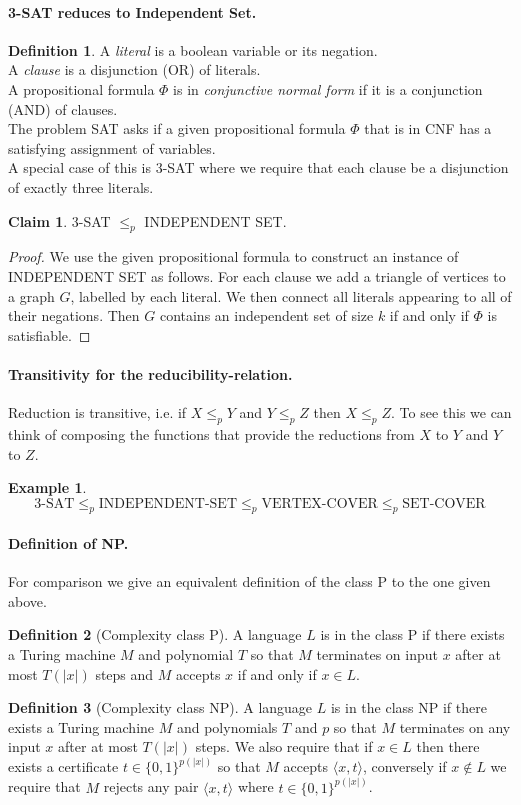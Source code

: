 \documentclass[11pt,a4paper]{article}
\theoremstyle{definition}
\newtheorem{claim}{Claim}
\newtheorem{defn}{Definition}
\newtheorem*{ex}{Example}
\begin{document}
\paragraph{3-SAT reduces to Independent Set.}
\begin{defn}
A \emph{literal} is a boolean variable or its negation.\\
A \emph{clause} is a disjunction (OR) of literals.\\
A propositional formula $\Phi$ is in \emph{conjunctive normal form} if it is a conjunction (AND) of clauses.\\
The problem SAT asks if a given propositional formula $\Phi$ that is in CNF has a satisfying assignment of variables.\\
A special case of this is 3-SAT where we require that each clause be a disjunction of exactly three literals.
\end{defn}
\begin{claim}
3-SAT $\le_p$ INDEPENDENT SET.
\end{claim}
\begin{proof}
We use the given propositional formula to construct an instance of INDEPENDENT SET as follows.
For each clause we add a triangle of vertices to a graph $G$, labelled by each literal.
We then connect all literals appearing to all of their negations.
Then $G$ contains an independent set of size $k$ if and only if $\Phi$ is satisfiable.
\end{proof}

\paragraph{Transitivity for the reducibility-relation.}
Reduction is transitive, i.e. if $X \le_p Y$ and $Y \le_p Z$ then $X\le_p Z$.
To see this we can think of composing the functions that provide the reductions from $X$ to $Y$ and $Y$ to $Z$.
\begin{ex}
\[
3\text{-SAT}\le_p \text{INDEPENDENT-SET} \le_p \text{VERTEX-COVER} \le_p \text{SET-COVER}
\]
\end{ex}

\paragraph{Definition of NP.}
For comparison we give an equivalent definition of the class P to the one given above.
\begin{defn}[Complexity class P]
A language $L$ is in the class P if there exists a Turing machine $M$ and polynomial $T$ so that $M$ terminates on input $x$ after at most $T(|x|)$ steps and $M$ accepts $x$ if and only if $x\in L$.
\end{defn}
\begin{defn}[Complexity class NP]
A language $L$ is in the class NP if there exists a Turing machine $M$ and polynomials $T$ and $p$ so that $M$ terminates on any input $x$ after at most $T(|x|)$ steps.
We also require that if $x\in L$ then there exists a certificate $t\in\{0,1\}^{p(|x|)}$ so that $M$ accepts $\langle x, t\rangle$, conversely if $x\not\in L$ we require that $M$ rejects any pair $\langle x,t\rangle$ where $t\in\{0,1\}^{p(|x|)}$.
\end{defn}
\end{document}
